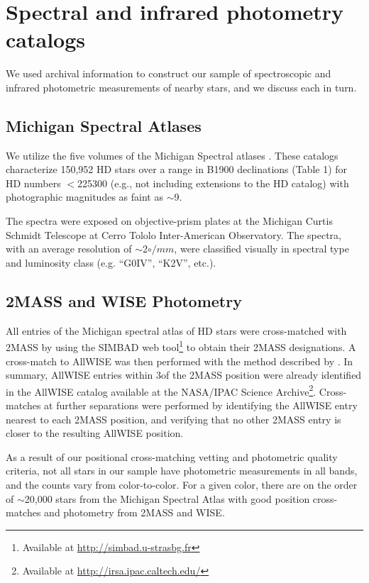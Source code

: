 \chapter{Spectral and infrared photometry catalogs}\label{chap:DATA}

We used archival information to construct our sample of spectroscopic and infrared photometric measurements of nearby stars, and we discuss each in turn.

\section{Michigan Spectral Atlases} \label{sec:michigan}

We utilize the five volumes of the Michigan Spectral atlases \citep[]{Houk1975, Houk1978, Houk1982,Houk1988,Houk1999}. These catalogs characterize 150,952 HD stars over a range in B1900 declinations (Table 1) for HD numbers $<$225300 (e.g., not including extensions to the HD catalog) with photographic magnitudes as faint as $\sim$9.

The spectra were exposed on objective-prism plates at the Michigan Curtis Schmidt Telescope at Cerro Tololo Inter-American Observatory. The spectra, with an average resolution of $\sim$2$\circ/mm$, were classified visually in spectral type and luminosity class (e.g. ``G0IV'', ``K2V'', etc.).  

\section{2MASS and WISE Photometry} \label{subsec:2MASS_WISE}

All entries of the Michigan spectral atlas of HD stars were cross-matched with 2MASS \citep{Skrutskie2006} by using the SIMBAD web tool\footnote{Available at \url{http://simbad.u-strasbg.fr}} to obtain their 2MASS designations. A cross-match to AllWISE \cite{ALLWISE,ALLWISE-dwarfs} was then performed with the method described by \cite{BANYAN}. In summary, AllWISE entries within 3\arcsec of the 2MASS position were already identified in the AllWISE catalog available at the NASA/IPAC Science Archive\footnote{Available at \url{http://irsa.ipac.caltech.edu/}}. Cross-matches at further separations were performed by identifying the AllWISE entry nearest to each 2MASS position, and verifying that no other 2MASS entry is closer to the resulting AllWISE position.

As a result of our positional cross-matching vetting and photometric quality criteria, not all stars in our sample have photometric measurements in all bands, and the counts vary from color-to-color.  For a given color, there are on the order of $\sim$20,000 stars from the Michigan Spectral Atlas with good position cross-matches and photometry from 2MASS and WISE.




